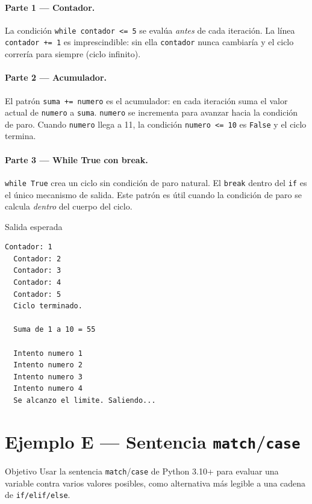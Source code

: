 \documentclass[12pt,a4paper]{article}
\begin{document}
\paragraph{Parte 1 — Contador.}
La condición \texttt{while contador <= 5} se evalúa \emph{antes} de cada
iteración.  La línea \texttt{contador += 1} es imprescindible: sin ella
\texttt{contador} nunca cambiaría y el ciclo correría para siempre
(ciclo infinito).

\paragraph{Parte 2 — Acumulador.}
El patrón \texttt{suma += numero} es el acumulador: en cada iteración suma
el valor actual de \texttt{numero} a \texttt{suma}.  \texttt{numero} se
incrementa para avanzar hacia la condición de paro.  Cuando \texttt{numero}
llega a 11, la condición \texttt{numero <= 10} es \texttt{False} y el ciclo
termina.

\paragraph{Parte 3 — While True con break.}
\texttt{while True} crea un ciclo sin condición de paro natural.  El
\texttt{break} dentro del \texttt{if} es el único mecanismo de salida.
Este patrón es útil cuando la condición de paro se calcula \emph{dentro}
del cuerpo del ciclo.

\vspace{0.6em}
\begin{salidabox}{Salida esperada}
\begin{lstlisting}[style=OutputStyle]
  Contador: 1
  Contador: 2
  Contador: 3
  Contador: 4
  Contador: 5
  Ciclo terminado.

  Suma de 1 a 10 = 55

  Intento numero 1
  Intento numero 2
  Intento numero 3
  Intento numero 4
  Se alcanzo el limite. Saliendo...
\end{lstlisting}
\end{salidabox}

\newpage
\section{Ejemplo E — Sentencia \texttt{match}/\texttt{case}}
\label{sec:ejemploE}

\begin{objetivobox}{Objetivo}
Usar la sentencia \texttt{match}/\texttt{case} de Python 3.10+ para
evaluar una variable contra varios valores posibles, como alternativa
más legible a una cadena de \texttt{if/elif/else}.
\end{objetivobox}
\end{document}
